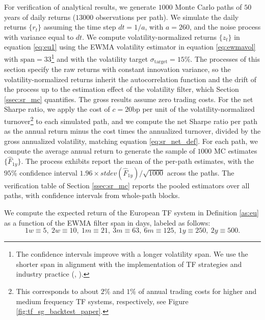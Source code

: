 \documentclass[hidelinks]{siamonline250211}
\newcommand{\spn}{\mathrm{span}}
\begin{document}
For verification of analytical results, we generate $1000$ Monte Carlo paths of $50$ years of daily returns ($13000$ observations per path). We simulate the daily returns $\{r_{t}\}$ assuming the time step $dt=1/a$, with $a=260$, and the noise process with variance equal to $dt$. We compute volatility-normalized returns $\{z_{t}\}$ in equation \eqref{eq:eu1} using the EWMA volatility estimator in equation \eqref{eq:ewmavol} with $\spn=33$\footnote{The confidence intervals improve with a longer volatility span. We use the shorter span in alignment with the implementation of TF strategies and industry practice (\cite{Bouchaud2017}, \cite{Robertson2025}).} and with the volatility target $\sigma_{\mathrm{target}}=15\%$. The processes of this section specify the raw returns with constant innovation variance, so the volatility-normalized returns inherit the autocorrelation function and the drift of the process up to the estimation effect of the volatility filter, which Section \ref{ssec:sr_mc} quantifies. The gross results assume zero trading costs. For the net Sharpe ratio, we apply the cost of $c=20$bp per unit of the volatility-normalized turnover\footnote{This corresponds to about $2\%$ and $1\%$ of annual trading costs for higher and medium frequency TF systems, respectively, see Figure \ref{fig:tf_sg_backtest_paper}.} to each simulated path, and we compute the net Sharpe ratio per path as the annual return minus the cost times the annualized turnover, divided by the gross annualized volatility, matching equation \eqref{eq:sr_net_def}. For each path, we compute the average annual return to generate the sample of $1000$ MC estimates $\{\hat{F}_{1y}\}$. The process exhibits report the mean of the per-path estimates, with the $95\%$ confidence interval $1.96\times stdev(\hat{F}_{1y})/\sqrt{1000}$ across the paths. The verification table of Section \ref{ssec:sr_mc} reports the pooled estimators over all paths, with confidence intervals from whole-path blocks.

We compute the expected return of the European TF system in Definition \ref{as:eu} as a function of the EWMA filter span in days, labeled as follows:
\begin{equation} \label{eq:fs1} 
	1w \equiv 5, \ 2w \equiv 10, \ 1m \equiv 21, \ 3m \equiv 63, \ 6m \equiv 125, \ 1y \equiv 250, \ 2y \equiv 500.
\end{equation}
\end{document}

